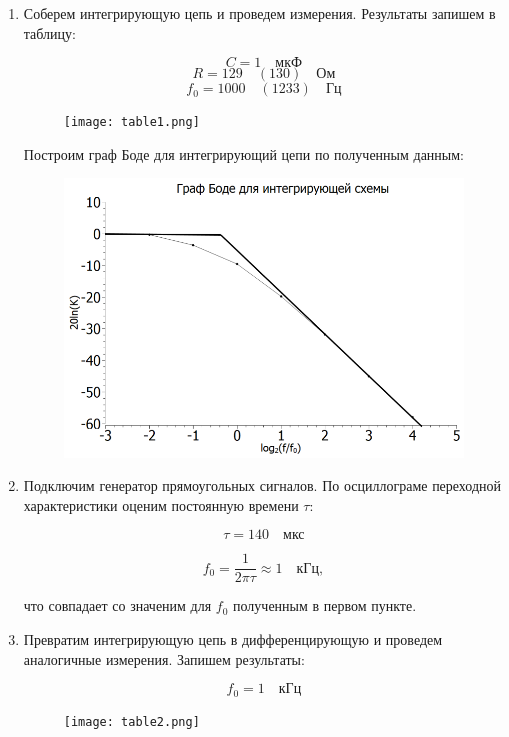 \documentclass[a4paper, 12pt]{article}%
\begin{document}
\begin{enumerate}

\item Соберем интегрирующую цепь и проведем измерения. Результаты запишем в таблицу:

\[C = 1 \quad \textit{мкФ}\]
\[R = 129 \quad (130) \quad \textit{Ом}\]
\[f_0 = 1000 \quad (1233) \quad \textit{Гц} \]

\begin{figure}[h!]
\centering
\texttt{[image: table1.png]}
\label{fig:Image1}
\end{figure}

Построим граф Боде для интегрирующий цепи по полученным данным:

\begin{figure}[h!]
\centering
\includegraphics[scale=0.5]{graph1.png}
\label{fig:Image1}
\end{figure}

\item Подключим генератор прямоугольных сигналов. По осциллограме переходной характеристики оценим постоянную времени $\tau$:

\[\tau = 140 \quad \textit{мкс}\]

\[f_0 = \frac{1}{2\pi\tau} \approx 1 \quad \textit{кГц},\]

что совпадает со значеним для $f_0$ полученным в первом пункте.

\item Превратим интегрирующую цепь в дифференцирующую и проведем аналогичные измерения. Запишем результаты:

\[f_0 = 1 \quad \textit{кГц}\]

\begin{figure}[h!]
\centering
\texttt{[image: table2.png]}
\label{fig:Image1}
\end{figure}


\end{enumerate}
\end{document}
